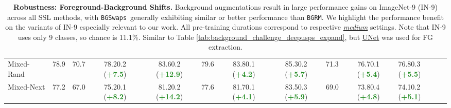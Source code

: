 \documentclass[twoside,11pt]{article}
\newcommand{\bgrm}{\texttt{BG\textunderscore RM}}
\newcommand{\bgswaps}{\texttt{BG\textunderscore Swaps}}
\begin{document}
\begin{table}
{\begin{tabular}{lcccccccccl}
\rowcolor{lightgray}
Mixed-Rand  & 78.9 & 70.7 &  78.2{\scriptsize{0.2}} (\textbf{\textcolor{ForestGreen}{+7.5}}) & 83.6{\scriptsize{0.2}} (\textbf{\textcolor{ForestGreen}{+12.9}})  & 79.6  & 83.8{\scriptsize{0.1}} (\textbf{\textcolor{ForestGreen}{+4.2}})   &   85.3{\scriptsize{0.2}} (\textbf{\textcolor{ForestGreen}{+5.7}}) &    71.3 & 76.7{\scriptsize{0.1}} (\textbf{\textcolor{ForestGreen}{+5.4}}) & 76.8{\scriptsize{0.3}} (\textbf{\textcolor{ForestGreen}{+5.5}}) \\
\rowcolor{lightgray}
Mixed-Next  & 77.2 & 67.0 &  75.2{\scriptsize{0.1}} (\textbf{\textcolor{ForestGreen}{+8.2}})  & 81.2{\scriptsize{0.2}} (\textbf{\textcolor{ForestGreen}{+14.2}})  & 77.6  & 81.7{\scriptsize{0.1}} (\textbf{\textcolor{ForestGreen}{+4.1}})   &   83.5{\scriptsize{0.3}} (\textbf{\textcolor{ForestGreen}{+5.9}}) &    69.0 & 73.8{\scriptsize{0.4}} (\textbf{\textcolor{ForestGreen}{+4.8}}) & 74.1{\scriptsize{0.2}} (\textbf{\textcolor{ForestGreen}{+5.1}}) \\\bottomrule
    \end{tabular}
    }
    \caption{\textbf{Robustness: Foreground-Background Shifts.} Background augmentations result in large performance gains on ImageNet-9 (IN-9) across all SSL methods, with \bgswaps~generally exhibiting similar or better performance than \bgrm. We highlight the performance benefit on the variants of IN-9 especially relevant to our work. All pre-training durations correspond to respective \underline{\textit{medium}} settings. Note that IN-9 uses only 9 classes, so chance is 11.1\%. Similar to Table \ref{tab:background_challenge_deepusps_expand}, but \underline{UNet} was used for FG extraction.}
    \label{tab:background_challenge_u2net}
\end{table}
\end{document}
